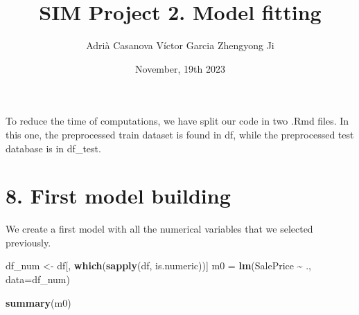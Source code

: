 \documentclass[
]{article}
\title{SIM Project 2. Model fitting}
\author{Adrià Casanova Víctor Garcia Zhengyong Ji}
\date{November, 19th 2023}
\newenvironment{Shaded}{\begin{snugshade}}{\end{snugshade}}
\newcommand{\AttributeTok}[1]{\textcolor[rgb]{0.13,0.29,0.53}{#1}}
\newcommand{\FunctionTok}[1]{\textcolor[rgb]{0.13,0.29,0.53}{\textbf{#1}}}
\newcommand{\NormalTok}[1]{#1}
\newcommand{\OtherTok}[1]{\textcolor[rgb]{0.56,0.35,0.01}{#1}}
\newcommand{\SpecialCharTok}[1]{\textcolor[rgb]{0.81,0.36,0.00}{\textbf{#1}}}
\begin{document}
\maketitle

{
\setcounter{tocdepth}{3}
\tableofcontents
}
To reduce the time of computations, we have split our code in two .Rmd
files. In this one, the preprocessed train dataset is found in df, while
the preprocessed test database is in df\_test.

\hypertarget{first-model-building}{%
\section{8. First model building}\label{first-model-building}}

We create a first model with all the numerical variables that we
selected previously.

\begin{Shaded}
\begin{Highlighting}[]
\NormalTok{df\_num }\OtherTok{\textless{}{-}}\NormalTok{ df[, }\FunctionTok{which}\NormalTok{(}\FunctionTok{sapply}\NormalTok{(df, is.numeric))]}
\NormalTok{m0 }\OtherTok{=} \FunctionTok{lm}\NormalTok{(SalePrice }\SpecialCharTok{\textasciitilde{}}\NormalTok{ ., }\AttributeTok{data=}\NormalTok{df\_num)}

\FunctionTok{summary}\NormalTok{(m0)}
\end{Highlighting}
\end{Shaded}
\end{document}
